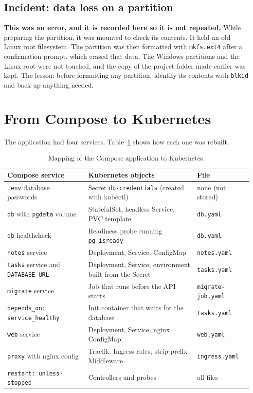 \documentclass[11pt,a4paper]{article}
\begin{document}
\subsection{Incident: data loss on a partition}
\textbf{This was an error, and it is recorded here so it is not repeated.} While preparing the partition, it was mounted to check its contents. It held an old Linux root filesystem. The partition was then formatted with \texttt{mkfs.ext4} after a confirmation prompt, which erased that data. The Windows partitions and the Linux root were not touched, and the copy of the project folder made earlier was kept. The lesson: before formatting any partition, identify its contents with \texttt{blkid} and back up anything needed.

\section{From Compose to Kubernetes}
The application had four services. Table~\ref{tab:mapping} shows how each one was rebuilt.

\begin{table}[H]
\centering
\small
\begin{tabular}{@{}p{4.2cm}p{5.8cm}p{4.2cm}@{}}
\toprule
Compose service & Kubernetes objects & File \\
\midrule
\texttt{.env} database passwords & Secret \texttt{db-credentials} (created with kubectl) & none (not stored) \\
\texttt{db} with \texttt{pgdata} volume & StatefulSet, headless Service, PVC template & \texttt{db.yaml} \\
\texttt{db} healthcheck & Readiness probe running \texttt{pg\_isready} & \texttt{db.yaml} \\
\texttt{notes} service & Deployment, Service, ConfigMap & \texttt{notes.yaml} \\
\texttt{tasks} service and \texttt{DATABASE\_URL} & Deployment, Service, environment built from the Secret & \texttt{tasks.yaml} \\
\texttt{migrate} service & Job that runs before the API starts & \texttt{migrate-job.yaml} \\
\texttt{depends\_on: service\_healthy} & Init container that waits for the database & \texttt{tasks.yaml} \\
\texttt{web} service & Deployment, Service, nginx ConfigMap & \texttt{web.yaml} \\
\texttt{proxy} with nginx config & Traefik, Ingress rules, strip-prefix Middleware & \texttt{ingress.yaml} \\
\texttt{restart: unless-stopped} & Controllers and probes & all files \\
\bottomrule
\end{tabular}
\caption{Mapping of the Compose application to Kubernetes.}
\label{tab:mapping}
\end{table}
\end{document}
